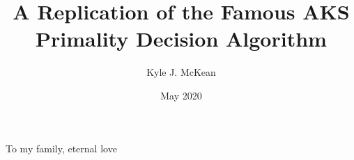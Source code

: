 \documentclass[12pt,twoside]{reedthesis}
\title{A Replication of the Famous AKS Primality Decision Algorithm}
\author{Kyle J. McKean}
\date{May 2020}
\newenvironment{dedication}{
  \begin{center}
    \thispagestyle{empty}
    \vspace*{\fill}
}{
    \vspace*{\fill}
  \end{center}
}
\begin{document}
\maketitle
\frontmatter
\pagestyle{empty}

\mainmatter
\pagestyle{fancyplain}

\begin{dedication}
  To my family, eternal love
\end{dedication}

\tableofcontents








\appendix

\backmatter

\nocite{gnu-parallel}


\end{document}
